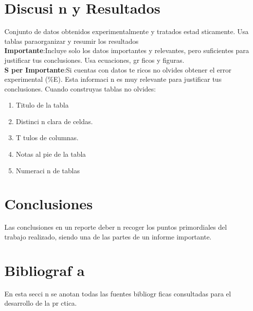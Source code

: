 \documentclass{article}
\begin{document}
\section{Discusi n y Resultados}
Conjunto  de  datos  obtenidos  experimentalmente  y  tratados  estad sticamente.  Usa  tablas  paraorganizar y resumir los resultados\\\textbf{Importante}:Incluye  solo  los  datos  importantes  y  relevantes,  pero  suficientes  para  justificar  tus conclusiones. Usa ecuaciones, gr ficos y figuras.\\\textbf{S per  Importante}:Si  cuentas  con  datos  te ricos  no  olvides  obtener  el  error  experimental  (\%E). Esta informaci n es muy relevante para justificar tus conclusiones.
Cuando construyas tablas no olvides:
\begin{enumerate}
    \item  Titulo de la tabla
    \item Distinci n clara de celdas.
    \item T tulos de columnas.
    \item Notas al pie de la tabla
    \item Numeraci n de tablas
\end{enumerate}
\section{Conclusiones}
Las conclusiones en un reporte deber n recoger los puntos primordiales del trabajo realizado, siendo una de las partes de un informe importante.

\section{Bibliograf a}

En esta secci n se anotan todas las fuentes bibliogr ficas consultadas para el desarrollo de la pr ctica.

\end{document}

